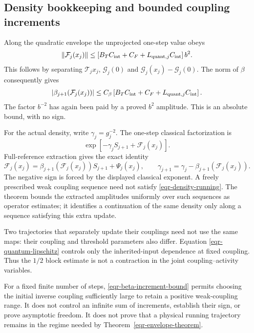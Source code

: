\documentclass[11pt]{article}
\theoremstyle{remark}
\begin{document}
\subsection{Density bookkeeping and bounded coupling increments}
\label{eqr-coupling-section}

Along the quadratic envelope the unprojected one-step value obeys
\begin{equation}
 \|\mathcal F_j(x_j)\|
 \le \left[B_TC_{\rm int}+C_F
                       +L_{{\rm quant},j}C_{\rm int}\right]b^2.
 \label{eqr-unprojected-size}
\end{equation}
This follows by separating $\mathcal T_jx_j$,
$\mathcal G_j(0)$ and
$\mathcal G_j(x_j)-\mathcal G_j(0)$.
The norm of $\beta$ consequently gives
\begin{equation}
 |\beta_{j+1}(\mathcal F_j(x_j))|
 \le C_\beta\left[B_TC_{\rm int}+C_F
                       +L_{{\rm quant},j}C_{\rm int}\right].
 \label{eqr-beta-increment-bound}
\end{equation}
The factor $b^{-2}$ has again been paid by a proved $b^2$
amplitude. This is an absolute bound, with no sign.

For the actual density, write $\gamma_j=g_j^{-2}$. The
one-step classical factorization is
\[
        \exp[-\gamma_j S_{j+1}+\mathcal F_j(x_j)].
\]
Full-reference extraction gives the exact identity
\begin{equation}
 \mathcal F_j(x_j)
  =\beta_{j+1}(\mathcal F_j(x_j))S_{j+1}+\Psi_j(x_j),
 \qquad
 \gamma_{j+1}
  =\gamma_j-\beta_{j+1}(\mathcal F_j(x_j)).
 \label{eqr-density-running}
\end{equation}
The negative sign is forced by the displayed classical exponent.
A freely prescribed weak coupling sequence need not satisfy
\eqref{eqr-density-running}. The theorem bounds the extracted
amplitudes uniformly over such sequences as operator estimates;
it identifies a continuation of the same density only along
a sequence satisfying this extra update.

Two trajectories that separately update their couplings need
not use the same maps: their coupling and threshold parameters
also differ. Equation \eqref{eqr-quantum-lipschitz} controls only
the inherited-input dependence at fixed coupling. Thus the
$1/2$ block estimate is not a contraction in the joint
coupling--activity variables.

For a fixed finite number of steps,
\eqref{eqr-beta-increment-bound} permits choosing the initial
inverse coupling sufficiently large to retain a positive
weak-coupling range. It does not control an infinite sum of
increments, establish their sign, or prove asymptotic freedom.
It does not prove that a physical running trajectory remains
in the regime needed by Theorem~\ref{eqr-envelope-theorem}.
\end{document}
